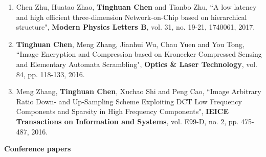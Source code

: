 \documentclass[letterpaper,11pt]{article}%
\begin{document}
\begin{enumerate}[(1)]
\item Chen Zhu, Huatao Zhao, \textbf{Tinghuan Chen} and Tianbo Zhu, ``A low latency and high efficient three-dimension Network-on-Chip based on hierarchical structure", \textbf{Modern Physics Letters B}, vol. 31, no. 19-21, 1740061, 2017.

\item \textbf{Tinghuan Chen}, Meng Zhang, Jianhui Wu, Chau Yuen and You Tong, ``Image Encryption and Compression based on Kronecker Compressed Sensing and Elementary Automata Scrambling", \textbf{Optics \& Laser Technology}, vol. 84, pp. 118-133, 2016.

\item Meng Zhang, \textbf{Tinghuan Chen}, Xuchao Shi and Peng Cao, ``Image Arbitrary Ratio Down- and Up-Sampling Scheme Exploiting DCT Low Frequency Components and Sparsity in High Frequency Components", \textbf{IEICE Transactions on Information and Systems}, vol. E99-D, no. 2, pp. 475-487, 2016.


\end{enumerate}

\textbf{Conference papers}
\end{document}
